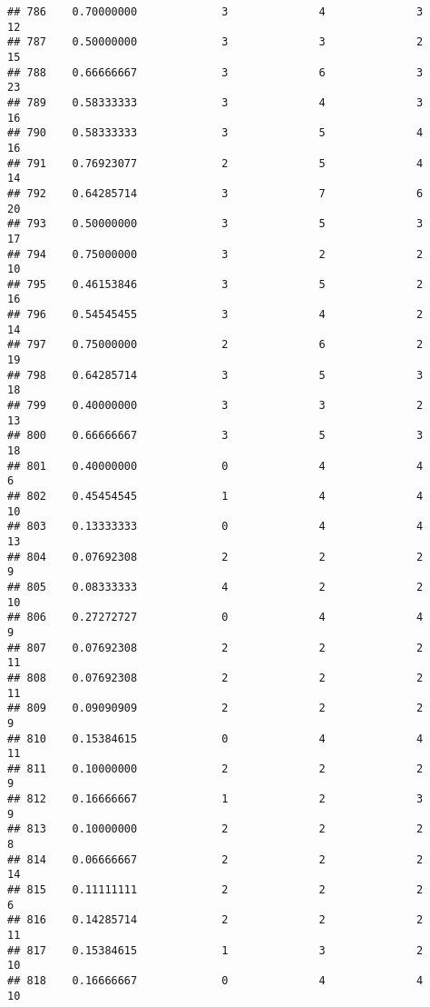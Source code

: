 \documentclass[
]{article}
\begin{document}
\begin{verbatim}
## 786    0.70000000             3              4              3             12
## 787    0.50000000             3              3              2             15
## 788    0.66666667             3              6              3             23
## 789    0.58333333             3              4              3             16
## 790    0.58333333             3              5              4             16
## 791    0.76923077             2              5              4             14
## 792    0.64285714             3              7              6             20
## 793    0.50000000             3              5              3             17
## 794    0.75000000             3              2              2             10
## 795    0.46153846             3              5              2             16
## 796    0.54545455             3              4              2             14
## 797    0.75000000             2              6              2             19
## 798    0.64285714             3              5              3             18
## 799    0.40000000             3              3              2             13
## 800    0.66666667             3              5              3             18
## 801    0.40000000             0              4              4              6
## 802    0.45454545             1              4              4             10
## 803    0.13333333             0              4              4             13
## 804    0.07692308             2              2              2              9
## 805    0.08333333             4              2              2             10
## 806    0.27272727             0              4              4              9
## 807    0.07692308             2              2              2             11
## 808    0.07692308             2              2              2             11
## 809    0.09090909             2              2              2              9
## 810    0.15384615             0              4              4             11
## 811    0.10000000             2              2              2              9
## 812    0.16666667             1              2              3              9
## 813    0.10000000             2              2              2              8
## 814    0.06666667             2              2              2             14
## 815    0.11111111             2              2              2              6
## 816    0.14285714             2              2              2             11
## 817    0.15384615             1              3              2             10
## 818    0.16666667             0              4              4             10

\end{verbatim}
\end{document}
